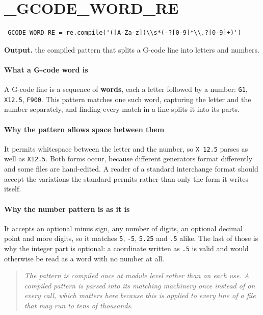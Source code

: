 \section{\_GCODE\_WORD\_RE}
\begin{lstlisting}[style=sig]
_GCODE_WORD_RE = re.compile('([A-Za-z])\\s*(-?[0-9]*\\.?[0-9]+)')
\end{lstlisting}

\noindent\textbf{Output.} the compiled pattern that splits a G-code line into letters and numbers.


\paragraph{What a G-code word is}
A G-code line is a sequence of \textbf{words}, each a letter followed by a number: \texttt{G1}, \texttt{X12.5}, \texttt{F900}. This pattern matches one such word, capturing the letter and the number separately, and finding every match in a line splits it into its parts.


\paragraph{Why the pattern allows space between them}
It permits whitespace between the letter and the number, so \texttt{X 12.5} parses as well as \texttt{X12.5}. Both forms occur, because different generators format differently and some files are hand-edited. A reader of a standard interchange format should accept the variations the standard permits rather than only the form it writes itself.


\paragraph{Why the number pattern is as it is}
It accepts an optional minus sign, any number of digits, an optional decimal point and more digits, so it matches \texttt{5}, \texttt{-5}, \texttt{5.25} and \texttt{.5} alike. The last of those is why the integer part is optional: a coordinate written as \texttt{.5} is valid and would otherwise be read as a word with no number at all.


\begin{quote}\small\itshape The pattern is compiled once at module level rather than on each use. A compiled pattern is parsed into its matching machinery once instead of on every call, which matters here because this is applied to every line of a file that may run to tens of thousands.\end{quote}

